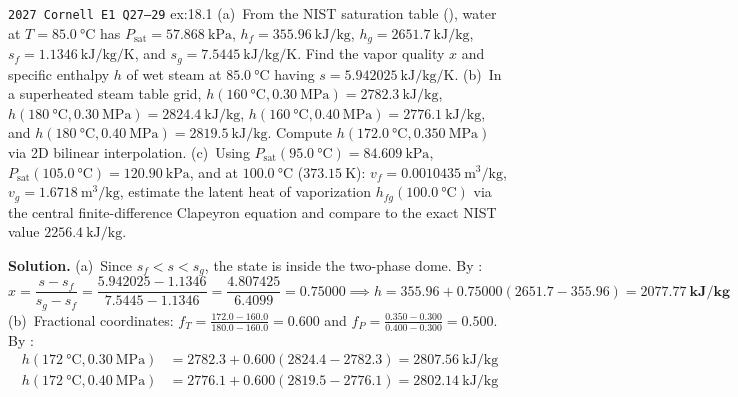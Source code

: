 \begin{workedexample}{\texttt{2027 Cornell E1 Q27--29} }{ex:18.1}
(a)~From the NIST saturation table (), water at $T = \SI{85.0}{\celsius}$ has $P_{\mathrm{sat}} = \SI{57.868}{\kilo\pascal}$, $h_f = \SI{355.96}{\kilo\joule\per\kilogram}$, $h_g = \SI{2651.7}{\kilo\joule\per\kilogram}$, $s_f = \SI{1.1346}{\kilo\joule\per\kilogram\per\kelvin}$, and $s_g = \SI{7.5445}{\kilo\joule\per\kilogram\per\kelvin}$. Find the vapor quality $x$ and specific enthalpy $h$ of wet steam at $\SI{85.0}{\celsius}$ having $s = \SI{5.942025}{\kilo\joule\per\kilogram\per\kelvin}$.
(b)~In a superheated steam table grid, $h(\SI{160}{\celsius}, \SI{0.30}{\mega\pascal}) = \SI{2782.3}{\kilo\joule\per\kilogram}$, $h(\SI{180}{\celsius}, \SI{0.30}{\mega\pascal}) = \SI{2824.4}{\kilo\joule\per\kilogram}$, $h(\SI{160}{\celsius}, \SI{0.40}{\mega\pascal}) = \SI{2776.1}{\kilo\joule\per\kilogram}$, and $h(\SI{180}{\celsius}, \SI{0.40}{\mega\pascal}) = \SI{2819.5}{\kilo\joule\per\kilogram}$. Compute $h(\SI{172.0}{\celsius}, \SI{0.350}{\mega\pascal})$ via 2D bilinear interpolation.
(c)~Using $P_{\mathrm{sat}}(\SI{95.0}{\celsius}) = \SI{84.609}{\kilo\pascal}$, $P_{\mathrm{sat}}(\SI{105.0}{\celsius}) = \SI{120.90}{\kilo\pascal}$, and at $\SI{100.0}{\celsius}$ ($\SI{373.15}{\kelvin}$): $v_f = \SI{0.0010435}{\cubic\meter\per\kilogram}$, $v_g = \SI{1.6718}{\cubic\meter\per\kilogram}$, estimate the latent heat of vaporization $h_{fg}(\SI{100.0}{\celsius})$ via the central finite-difference Clapeyron equation and compare to the exact NIST value $\SI{2256.4}{\kilo\joule\per\kilogram}$.
\par\smallskip\noindent
\textbf{Solution.}
(a)~Since $s_f < s < s_g$, the state is inside the two-phase dome. By :
$$x = \frac{s - s_f}{s_g - s_f} = \frac{5.942025 - 1.1346}{7.5445 - 1.1346} = \frac{4.807425}{6.4099} = \mathbf{0.75000} \implies h = 355.96 + 0.75000(2651.7 - 355.96) = \mathbf{\SI{2077.77}{\kilo\joule\per\kilogram}}$$
(b)~Fractional coordinates: $f_T = \frac{172.0 - 160.0}{180.0 - 160.0} = 0.600$ and $f_P = \frac{0.350 - 0.300}{0.400 - 0.300} = 0.500$. By :
\begin{align*}
  h(\SI{172}{\celsius}, \SI{0.30}{\mega\pascal}) &= 2782.3 + 0.600(2824.4 - 2782.3) = \SI{2807.56}{\kilo\joule\per\kilogram} \\
  h(\SI{172}{\celsius}, \SI{0.40}{\mega\pascal}) &= 2776.1 + 0.600(2819.5 - 2776.1) = \SI{2802.14}{\kilo\joule\per\kilogram} \\

\end{align*}
\end{workedexample}
